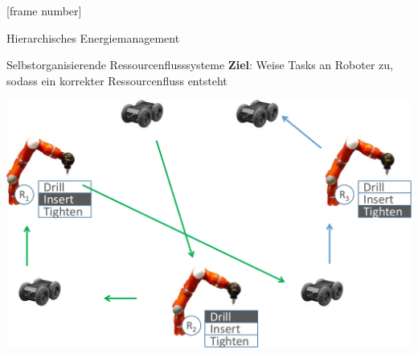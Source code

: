 

{

[frame number]{}



%
}
%


\begin{frame}{Hierarchisches Energiemanagement} \large

\begin{figure}
\centering

\label{fig:hierarchical-decomposition}
\end{figure}
\end{frame}

\begin{frame}{Selbstorganisierende Ressourcenflusssysteme}
\textbf{Ziel}: Weise Tasks an Roboter zu, sodass ein korrekter \alert{Ressourcenfluss} entsteht
\begin{center}
\includegraphics[width=.7\textwidth]{img/produktionszelle.pdf}
\end{center}

\hfill \cite{seebach2010software}

\end{frame}




